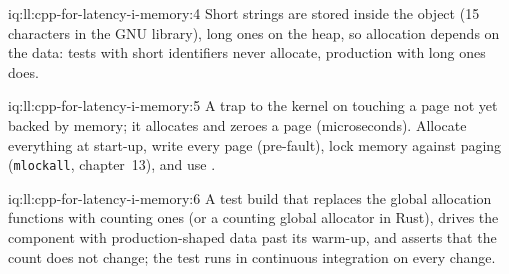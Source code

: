 \begin{solution}{iq:ll:cpp-for-latency-i-memory:4}
Short strings are stored inside the object (15 characters in the GNU library), long ones on the heap, so allocation depends
on the data: tests with short identifiers never allocate, production with long ones does.
\end{solution}

\begin{solution}{iq:ll:cpp-for-latency-i-memory:5}
A trap to the kernel on touching a page not yet backed by memory; it allocates and zeroes a page (microseconds). Allocate
everything at start-up, write every page (pre-fault), lock memory against paging (\texttt{mlockall}, chapter~13), and use
.
\end{solution}

\begin{solution}{iq:ll:cpp-for-latency-i-memory:6}
A test build that replaces the global allocation functions with counting ones (or a counting global allocator in Rust),
drives the component with production-shaped data past its warm-up, and asserts that the count does not change; the test
runs in continuous integration on every change.
\end{solution}
